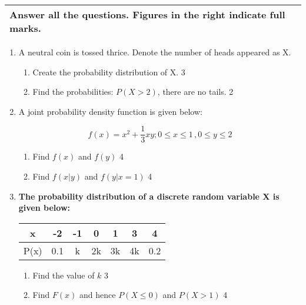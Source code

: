 \documentclass[10pt]{article}
\begin{document}
\noindent
\begin{tabular}{p{\dimexpr\linewidth-2\tabcolsep}}
  \textbf{Answer all the questions. Figures in the right indicate full marks.}\\
  \hline
\end{tabular}

\begin{enumerate}

\item A neutral coin is tossed thrice. Denote the number of heads appeared as X. 

\begin{enumerate}
\item Create the probability distribution of X. \hfill 3
\item Find the probabilities: $P(X>2)$, there are no tails. \hfill 2
\end{enumerate}

\item A joint probability density function is given below:

\[f(x) = x^2+ \frac13 xy; 0\le x \le 1\,, 0\le y \le 2\]

\begin{enumerate}

\item Find $f(x)$ and $f(y)$ \hfill 4
\item Find $f(x|y)$ and $f(y|x=1)$ \hfill 4

\end{enumerate}

\item \textbf{The probability distribution of a discrete random variable X is given below:} 

	  \begin{table}[h]
	  \begin{center}
\begin{tabular}{c|cccccc}
x    & -2   & -1 & 0   & 1 & 3 & 4   \\ \hline
P(x) & 0.1 & k & 2k & 3k & 4k & 0.2
\end{tabular} 
\end{center}	
\end{table}

\begin{enumerate}

\item Find the value of $k$ \hfill 3
\item Find $F(x)$ and hence $P(X \le 0)$ and $P(X > 1)$ \hfill 4

\end{enumerate}

\end{enumerate}
\end{document}
